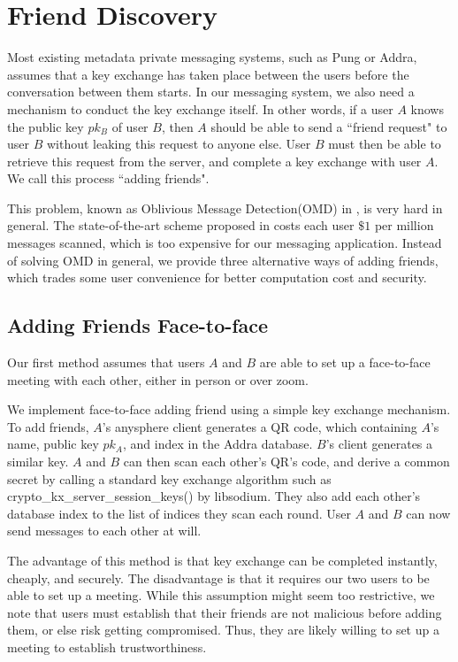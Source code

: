 \section{Friend Discovery}

Most existing metadata private messaging systems, such as Pung or Addra, assumes that a key exchange has taken place between the users before the conversation between them starts. In our messaging system, we also need a mechanism to conduct the key exchange itself. In other words, if a user $A$ knows the public key $pk_B$ of user $B$, then $A$ should be able to send a ``friend request" to user $B$ without leaking this request to anyone else. User $B$ must then be able to retrieve this request from the server, and complete a key exchange with user $A$. We call this process ``adding friends".

This problem, known as Oblivious Message Detection(OMD) in \cite{liutromer2021}, is very hard in general. The state-of-the-art scheme proposed in \cite{liutromer2021} costs each user $\$ 1$ per million messages scanned, which is too expensive for our messaging application. Instead of solving OMD in general, we provide three alternative ways of adding friends, which trades some user convenience for better computation cost and security.

\subsection{Adding Friends Face-to-face}
Our first method assumes that users $A$ and $B$ are able to set up a face-to-face meeting with each other, either in person or over zoom.

We implement face-to-face adding friend using a simple key exchange mechanism. To add friends, $A$'s anysphere client generates a QR code, which containing $A$'s name, public key $pk_A$, and index in the Addra database. $B$'s client generates a similar key. $A$ and $B$ can then scan each other's QR's code,  and derive a common secret by calling a standard key exchange algorithm such as crypto\_kx\_server\_session\_keys()  by libsodium. They also add each other's database index to the list of indices they scan each round. User $A$ and $B$ can now send messages to each other at will.

The advantage of this method is that key exchange can be completed instantly, cheaply, and securely. The disadvantage is that it requires our two users to be able to set up a meeting. While this assumption might seem too restrictive, we note that users must establish that their friends are not malicious before adding them, or else risk getting compromised. Thus, they are likely willing to set up a meeting to establish trustworthiness.

